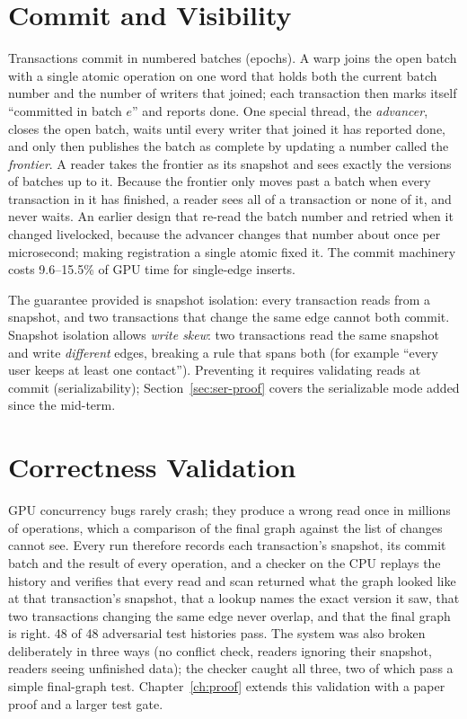 \documentclass[11pt,a4paper,oneside]{report}
\begin{document}
\section{Commit and Visibility}
\label{sec:commit}
Transactions commit in numbered batches (epochs). A warp joins the open batch with a single atomic operation on one
word that holds both the current batch number and the number of writers that joined; each transaction then marks itself
``committed in batch $e$'' and reports done. One special thread, the \emph{advancer}, closes the open batch, waits until
every writer that joined it has reported done, and only then publishes the batch as complete by updating a number
called the \emph{frontier}. A reader takes the frontier as its snapshot and sees exactly the versions of batches up to
it. Because the frontier only moves past a batch when every transaction in it has finished, a reader sees all of a
transaction or none of it, and never waits. An earlier design that re-read the batch number and retried when it changed
livelocked, because the advancer changes that number about once per microsecond; making registration a single atomic
fixed it. The commit machinery costs 9.6--15.5\% of GPU time for single-edge inserts.

The guarantee provided is snapshot isolation: every transaction reads from a snapshot, and two transactions that change
the same edge cannot both commit. Snapshot isolation allows \emph{write skew}: two transactions read the same snapshot
and write \emph{different} edges, breaking a rule that spans both (for example ``every user keeps at least one
contact''). Preventing it requires validating reads at commit (serializability); Section~\ref{sec:ser-proof} covers
the serializable mode added since the mid-term.

\section{Correctness Validation}
GPU concurrency bugs rarely crash; they produce a wrong read once in millions of operations, which a comparison of the
final graph against the list of changes cannot see. Every run therefore records each transaction's snapshot, its commit
batch and the result of every operation, and a checker on the CPU replays the history and verifies that every read and
scan returned what the graph looked like at that transaction's snapshot, that a lookup names the exact version it saw,
that two transactions changing the same edge never overlap, and that the final graph is right. 48 of 48 adversarial
test histories pass. The system was also broken deliberately in three ways (no conflict check, readers ignoring their
snapshot, readers seeing unfinished data); the checker caught all three, two of which pass a simple final-graph test.
Chapter~\ref{ch:proof} extends this validation with a paper proof and a larger test gate.
\end{document}
